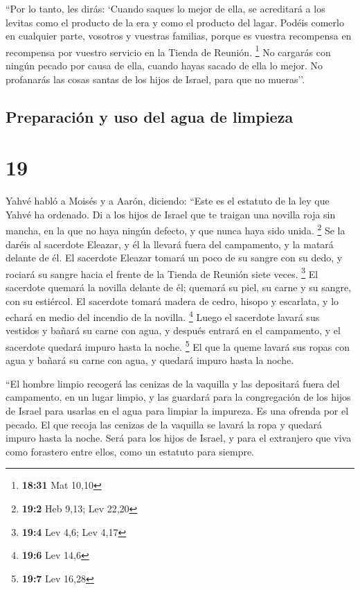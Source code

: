  ``Por lo tanto, les dirás: `Cuando saques lo mejor de
ella, se acreditará a los levitas como el producto de la era y como el
producto del lagar.  Podéis comerlo en cualquier parte,
vosotros y vuestras familias, porque es vuestra recompensa en recompensa
por vuestro servicio en la Tienda de Reunión. \footnote{\textbf{18:31}
  Mat 10,10}  No cargarás con ningún pecado por causa de
ella, cuando hayas sacado de ella lo mejor. No profanarás las cosas
santas de los hijos de Israel, para que no mueras''.

\hypertarget{preparaciuxf3n-y-uso-del-agua-de-limpieza}{%
\subsection{Preparación y uso del agua de
limpieza}\label{preparaciuxf3n-y-uso-del-agua-de-limpieza}}

\hypertarget{section-18}{%
\section{19}\label{section-18}}

 Yahvé habló a Moisés y a Aarón, diciendo: 
``Este es el estatuto de la ley que Yahvé ha ordenado. Di a los hijos de
Israel que te traigan una novilla roja sin mancha, en la que no haya
ningún defecto, y que nunca haya sido unida. \footnote{\textbf{19:2} Heb
  9,13; Lev 22,20}  Se la daréis al sacerdote Eleazar, y
él la llevará fuera del campamento, y la matará delante de él.
 El sacerdote Eleazar tomará un poco de su sangre con su
dedo, y rociará su sangre hacia el frente de la Tienda de Reunión siete
veces. \footnote{\textbf{19:4} Lev 4,6; Lev 4,17}  El
sacerdote quemará la novilla delante de él; quemará su piel, su carne y
su sangre, con su estiércol.  El sacerdote tomará madera
de cedro, hisopo y escarlata, y lo echará en medio del incendio de la
novilla. \footnote{\textbf{19:6} Lev 14,6}  Luego el
sacerdote lavará sus vestidos y bañará su carne con agua, y después
entrará en el campamento, y el sacerdote quedará impuro hasta la noche.
\footnote{\textbf{19:7} Lev 16,28}  El que la queme lavará
sus ropas con agua y bañará su carne con agua, y quedará impuro hasta la
noche.

 ``El hombre limpio recogerá las cenizas de la vaquilla y
las depositará fuera del campamento, en un lugar limpio, y las guardará
para la congregación de los hijos de Israel para usarlas en el agua para
limpiar la impureza. Es una ofrenda por el pecado.  El
que recoja las cenizas de la vaquilla se lavará la ropa y quedará impuro
hasta la noche. Será para los hijos de Israel, y para el extranjero que
viva como forastero entre ellos, como un estatuto para siempre.

